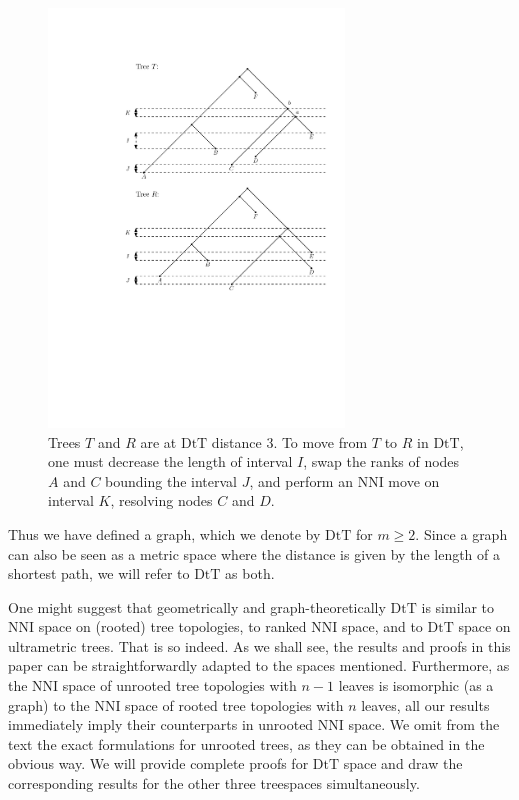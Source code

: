 \documentclass{amsart}
\newcommand{\mdts}{\mathrm{DtT}}
\begin{document}
\begin{figure}
\centering
\includegraphics[width=0.7\textwidth]{dts_neighbours.pdf}
\caption{Trees $T$ and $R$ are at $\mdts$ distance $3$.
To move from $T$ to $R$ in $\mdts$, one must decrease the length of interval $I$, swap the ranks of nodes $A$ and $C$ bounding the interval $J$, and perform an NNI move on interval $K$, resolving nodes $C$ and $D$.}
\label{dts_neighbours.pdf}
\end{figure}

Thus we have defined a graph, which we denote by $\mdts$ for $m \geq 2$.
Since a graph can also be seen as a metric space where the distance is given by the length of a shortest path, we will refer to $\mdts$ as both.

One might suggest that geometrically and graph-theoretically $\mdts$ is similar to NNI space on (rooted) tree topologies, to ranked NNI space, and to $\mdts$ space on ultrametric trees.
That is so indeed.
As we shall see, the results and proofs in this paper can be straightforwardly adapted to the spaces mentioned.
Furthermore, as the NNI space of unrooted tree topologies with $n-1$ leaves is isomorphic (as a graph) to the NNI space of rooted tree topologies with $n$ leaves, all our results immediately imply their counterparts in unrooted NNI space.
We omit from the text the exact formulations for unrooted trees, as they can be obtained in the obvious way.
We will provide complete proofs for $\mdts$ space and draw the corresponding results for the other three treespaces simultaneously.
\end{document}
